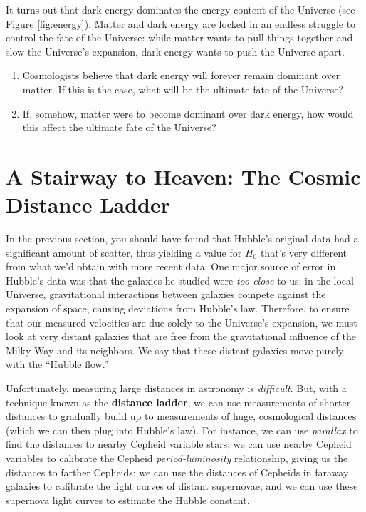 \documentclass[11pt]{article}
\begin{document}
It turns out that dark energy dominates the energy content of the Universe (see Figure \ref{fig:energy}). Matter and dark energy are locked in an endless struggle to control the fate of the Universe: while matter wants to pull things together and slow the Universe's expansion, dark energy wants to push the Universe apart.
\begin{enumerate}[resume]
    \item Cosmologists believe that dark energy will forever remain dominant over matter. If this is the case, what will be the ultimate fate of the Universe?
    
    \item If, somehow, matter were to become dominant over dark energy, how would this affect the ultimate fate of the Universe?
\end{enumerate}


\section{A Stairway to Heaven: The Cosmic Distance Ladder}

In the previous section, you should have found that Hubble's original data had a significant amount of scatter, thus yielding a value for $H_0$ that's very different from what we'd obtain with more recent data. One major source of error in Hubble's data was that the galaxies he studied were \emph{too close} to us; in the local Universe, gravitational interactions between galaxies compete against the expansion of space, causing deviations from Hubble's law. Therefore, to ensure that our measured velocities are due solely to the Universe's expansion, we must look at very distant galaxies that are free from the gravitational influence of the Milky Way and its neighbors. We say that these distant galaxies move purely with the ``Hubble flow.''

Unfortunately, measuring large distances in astronomy is \emph{difficult}. But, with a technique known as the \textbf{distance ladder}, we can use measurements of shorter distances to gradually build up to measurements of huge, cosmological distances (which we can then plug into Hubble's law). For instance, we can use \emph{parallax} to find the distances to nearby Cepheid variable stars; we can use nearby Cepheid variables to calibrate the Cepheid \emph{period-luminosity} relationship, giving us the distances to farther Cepheids; we can use the distances of Cepheids in faraway galaxies to calibrate the light curves of distant supernovae; and we can use these supernova light curves to estimate the Hubble constant.
\end{document}
